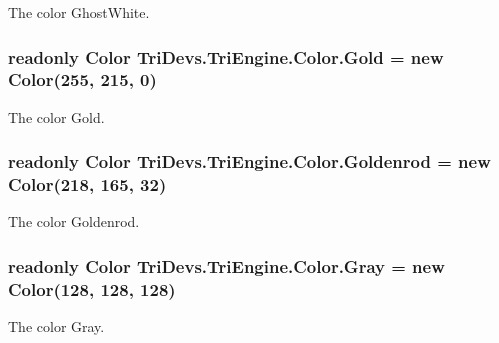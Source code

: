The color Ghost\-White. 

\hypertarget{struct_tri_devs_1_1_tri_engine_1_1_color_ad261bfb4f641fcc795c7ac4c5e0df9b5}{
\subsubsection[{Gold}]{\setlength{\rightskip}{0pt plus 5cm}readonly {\bf Color} Tri\-Devs.\-Tri\-Engine.\-Color.\-Gold = new {\bf Color}(255, 215, 0)\hspace{0.3cm}{\ttfamily [static]}}}\label{struct_tri_devs_1_1_tri_engine_1_1_color_ad261bfb4f641fcc795c7ac4c5e0df9b5}


The color Gold. 

\hypertarget{struct_tri_devs_1_1_tri_engine_1_1_color_aa31391281c8f1dff82333b7c2e247f1e}{
\subsubsection[{Goldenrod}]{\setlength{\rightskip}{0pt plus 5cm}readonly {\bf Color} Tri\-Devs.\-Tri\-Engine.\-Color.\-Goldenrod = new {\bf Color}(218, 165, 32)\hspace{0.3cm}{\ttfamily [static]}}}\label{struct_tri_devs_1_1_tri_engine_1_1_color_aa31391281c8f1dff82333b7c2e247f1e}


The color Goldenrod. 

\hypertarget{struct_tri_devs_1_1_tri_engine_1_1_color_a35a7faccbf665c7e359f6fe03ef32477}{
\subsubsection[{Gray}]{\setlength{\rightskip}{0pt plus 5cm}readonly {\bf Color} Tri\-Devs.\-Tri\-Engine.\-Color.\-Gray = new {\bf Color}(128, 128, 128)\hspace{0.3cm}{\ttfamily [static]}}}\label{struct_tri_devs_1_1_tri_engine_1_1_color_a35a7faccbf665c7e359f6fe03ef32477}


The color Gray. 

